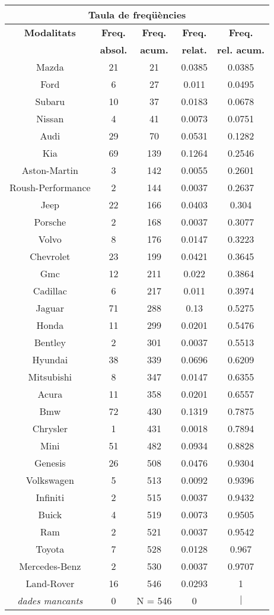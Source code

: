 \begin{center}
\begin{tabular}{|c|c|c|c|@{}c@{}|}
\hline
\multicolumn{5}{|c|}{\bf Taula de freq\" u\`encies} \\ 
\hline
{\bf Modalitats} & {\bf Freq.} & {\bf Freq.} & {\bf Freq.} & {\bf Freq.} \\ 
 & {\bf absol.} & {\bf acum.} & {\bf relat.} & {\bf rel. acum.} \\ 
\hline
\hline
Mazda & 21 & 21 & 0.0385 & 0.0385 \\ 
Ford & 6 & 27 & 0.011 & 0.0495 \\ 
Subaru & 10 & 37 & 0.0183 & 0.0678 \\ 
Nissan & 4 & 41 & 0.0073 & 0.0751 \\ 
Audi & 29 & 70 & 0.0531 & 0.1282 \\ 
Kia & 69 & 139 & 0.1264 & 0.2546 \\ 
Aston-Martin & 3 & 142 & 0.0055 & 0.2601 \\ 
Roush-Performance & 2 & 144 & 0.0037 & 0.2637 \\ 
Jeep & 22 & 166 & 0.0403 & 0.304 \\ 
Porsche & 2 & 168 & 0.0037 & 0.3077 \\ 
Volvo & 8 & 176 & 0.0147 & 0.3223 \\ 
Chevrolet & 23 & 199 & 0.0421 & 0.3645 \\ 
Gmc & 12 & 211 & 0.022 & 0.3864 \\ 
Cadillac & 6 & 217 & 0.011 & 0.3974 \\ 
Jaguar & 71 & 288 & 0.13 & 0.5275 \\ 
Honda & 11 & 299 & 0.0201 & 0.5476 \\ 
Bentley & 2 & 301 & 0.0037 & 0.5513 \\ 
Hyundai & 38 & 339 & 0.0696 & 0.6209 \\ 
Mitsubishi & 8 & 347 & 0.0147 & 0.6355 \\ 
Acura & 11 & 358 & 0.0201 & 0.6557 \\ 
Bmw & 72 & 430 & 0.1319 & 0.7875 \\ 
Chrysler & 1 & 431 & 0.0018 & 0.7894 \\ 
Mini & 51 & 482 & 0.0934 & 0.8828 \\ 
Genesis & 26 & 508 & 0.0476 & 0.9304 \\ 
Volkswagen & 5 & 513 & 0.0092 & 0.9396 \\ 
Infiniti & 2 & 515 & 0.0037 & 0.9432 \\ 
Buick & 4 & 519 & 0.0073 & 0.9505 \\ 
Ram & 2 & 521 & 0.0037 & 0.9542 \\ 
Toyota & 7 & 528 & 0.0128 & 0.967 \\ 
Mercedes-Benz & 2 & 530 & 0.0037 & 0.9707 \\ 
Land-Rover & 16 & 546 & 0.0293 & 1 \\ 
\hline
\hline
\it dades mancants & 0 & N = 546 & 0 & \colorbox{gris}{\color{gris}$|$ \hspace{11ex}} \\ 
\hline
\end{tabular}
\end{center} \vfill

